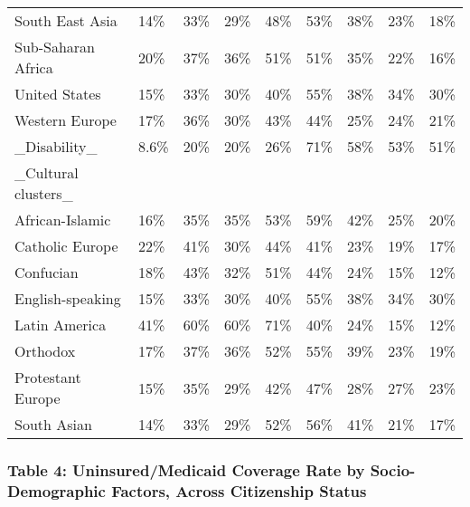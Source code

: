 \documentclass[
]{article}
\begin{document}
\begin{longtable}[t]{lllllllll}
South East Asia & 14\% & 33\% & 29\% & 48\% & 53\% & 38\% & 23\% & 18\%\\
Sub-Saharan Africa & 20\% & 37\% & 36\% & 51\% & 51\% & 35\% & 22\% & 16\%\\
United States & 15\% & 33\% & 30\% & 40\% & 55\% & 38\% & 34\% & 30\%\\
\addlinespace
Western Europe & 17\% & 36\% & 30\% & 43\% & 44\% & 25\% & 24\% & 21\%\\
\_Disability\_ & 8.6\% & 20\% & 20\% & 26\% & 71\% & 58\% & 53\% & 51\%\\
\_Cultural clusters\_ &  &  &  &  &  &  &  & \\
African-Islamic & 16\% & 35\% & 35\% & 53\% & 59\% & 42\% & 25\% & 20\%\\
Catholic Europe & 22\% & 41\% & 30\% & 44\% & 41\% & 23\% & 19\% & 17\%\\
\addlinespace
Confucian & 18\% & 43\% & 32\% & 51\% & 44\% & 24\% & 15\% & 12\%\\
English-speaking & 15\% & 33\% & 30\% & 40\% & 55\% & 38\% & 34\% & 30\%\\
Latin America & 41\% & 60\% & 60\% & 71\% & 40\% & 24\% & 15\% & 12\%\\
Orthodox & 17\% & 37\% & 36\% & 52\% & 55\% & 39\% & 23\% & 19\%\\
Protestant Europe & 15\% & 35\% & 29\% & 42\% & 47\% & 28\% & 27\% & 23\%\\
\addlinespace
South Asian & 14\% & 33\% & 29\% & 52\% & 56\% & 41\% & 21\% & 17\%\\*
\end{longtable}
\endgroup{}

\hypertarget{table-4-uninsuredmedicaid-coverage-rate-by-socio-demographic-factors-across-citizenship-status}{%
\subsubsection{Table 4: Uninsured/Medicaid Coverage Rate by
Socio-Demographic Factors, Across Citizenship
Status}\label{table-4-uninsuredmedicaid-coverage-rate-by-socio-demographic-factors-across-citizenship-status}}

\begingroup\fontsize{6}{8}\selectfont
\end{document}
